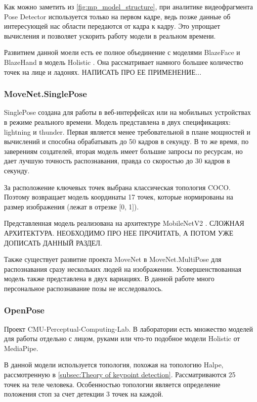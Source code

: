 Как можно заметить из \autoref{fig:mp_model_structure}, при аналитике видеофрагмента Pose Detector используется только на первом кадре, ведь позже данные об интересующей нас области передаются от кадра к кадру. Это упрощает вычисления и позволяет ускорить работу модели в реальном времени.

Развитием данной моели есть ее полное объединение с моделями BlazeFace и BlazeHand в модель Holistic \cite{Holistic}. Она рассматривает намного большее количество точек на лице и ладонях. НАПИСАТЬ ПРО ЕЕ ПРИМЕНЕНИЕ...


\subsubsection{MoveNet.SinglePose}

SinglePose создана для работы в веб-интерфейсах или на мобильных устройствах в режиме реального времени. Модель представлена в двух спецификациях: lightning и thunder. Первая является менее требовательной в плане мощностей и вычислений и способна обрабатывать до 50 кадров в секунду. В то же время, по заверениям создателей, вторая модель имеет большие запросы по ресурсам, но дает лучшую точность распознавания, правда со скоростью до 30 кадров в секунду.

За расположение ключевых точек выбрана классическая топология COCO. Поэтому возвращает модель координаты 17 точек, которые нормированы на размер изображения (лежат в отрезке [0, 1]).

\hfill \break
Представленная модель реализована на архитектуре MobileNetV2 \cite{mobilenetv2}. СЛОЖНАЯ АРХИТЕКТУРА. НЕОБХОДИМО ПРО НЕЕ ПРОЧИТАТЬ, А ПОТОМ УЖЕ ДОПИСАТЬ ДАННЫЙ РАЗДЕЛ.

Также существует развитие проекта MoveNet в MoveNet.MultiPose для распознавания сразу нескольких людей на изображении. Усовершенствованная модель также представлена в двух вариациях. В данной работе много персональное распознавание позы не исследовалось.

\subsubsection{OpenPose}

Проект CMU-Perceptual-Computing-Lab. В лаборатории есть множество моделей для работы отдельно с лицом, руками или что-то подобное модели Holistic от MediaPipe.

В данной модели используется топология, похожая на топологию Halpe, рассмотренную в \autoref{subsec:Theory of keypoint detection}. Рассматриваются 25 точек на теле человека. Особенностью топологии является определение положения стоп за счет детекции 3 точек на каждой.

